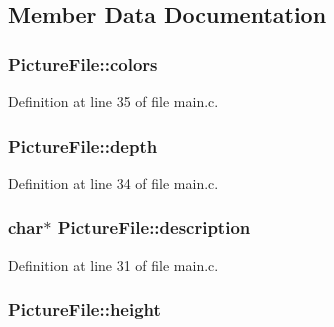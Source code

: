 \subsection{Member Data Documentation}
\subsubsection[{\texorpdfstring{colors}{colors}}]{ Picture\+File\+::colors}\hypertarget{struct_picture_file_a90d41cf1d2f15a65e830cebf03191d8a}{}\label{struct_picture_file_a90d41cf1d2f15a65e830cebf03191d8a}


Definition at line 35 of file main.\+c.

\subsubsection[{\texorpdfstring{depth}{depth}}]{ Picture\+File\+::depth}\hypertarget{struct_picture_file_a5b8c51bb1a31ada6eb9135208c42e2e3}{}\label{struct_picture_file_a5b8c51bb1a31ada6eb9135208c42e2e3}


Definition at line 34 of file main.\+c.

\subsubsection[{\texorpdfstring{description}{description}}]{ char$\ast$ Picture\+File\+::description}\hypertarget{struct_picture_file_ab662d36b1ceeaf480a7c3cdc010ef0a2}{}\label{struct_picture_file_ab662d36b1ceeaf480a7c3cdc010ef0a2}


Definition at line 31 of file main.\+c.

\subsubsection[{\texorpdfstring{height}{height}}]{ Picture\+File\+::height}\hypertarget{struct_picture_file_a1713bc95e99abde8fc3e5c44b02aa7b6}{}\label{struct_picture_file_a1713bc95e99abde8fc3e5c44b02aa7b6}


